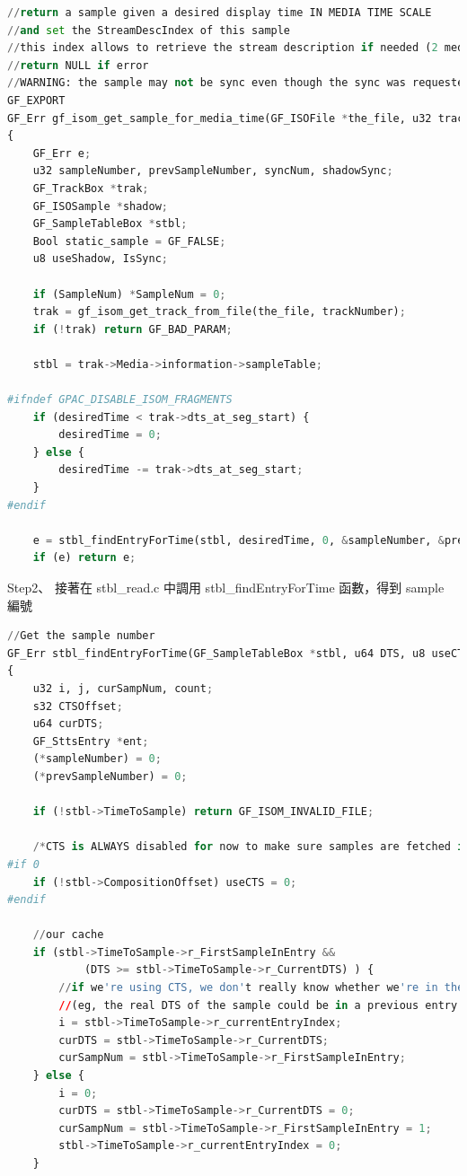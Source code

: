 \documentclass[10pt,UTF8]{ctexart}
\begin{document}
\begin{lstlisting}[language={python}]
//return a sample given a desired display time IN MEDIA TIME SCALE
//and set the StreamDescIndex of this sample
//this index allows to retrieve the stream description if needed (2 media in 1 track)
//return NULL if error
//WARNING: the sample may not be sync even though the sync was requested (depends on the media)
GF_EXPORT
GF_Err gf_isom_get_sample_for_media_time(GF_ISOFile *the_file, u32 trackNumber, u64 desiredTime, u32 *StreamDescriptionIndex, GF_ISOSearchMode SearchMode, GF_ISOSample **sample, u32 *SampleNum, u64 *data_offset)
{
	GF_Err e;
	u32 sampleNumber, prevSampleNumber, syncNum, shadowSync;
	GF_TrackBox *trak;
	GF_ISOSample *shadow;
	GF_SampleTableBox *stbl;
	Bool static_sample = GF_FALSE;
	u8 useShadow, IsSync;

	if (SampleNum) *SampleNum = 0;
	trak = gf_isom_get_track_from_file(the_file, trackNumber);
	if (!trak) return GF_BAD_PARAM;

	stbl = trak->Media->information->sampleTable;

#ifndef	GPAC_DISABLE_ISOM_FRAGMENTS
	if (desiredTime < trak->dts_at_seg_start) {
		desiredTime = 0;
	} else {
		desiredTime -= trak->dts_at_seg_start;
	}
#endif

	e = stbl_findEntryForTime(stbl, desiredTime, 0, &sampleNumber, &prevSampleNumber);
	if (e) return e;
\end{lstlisting}

Step2、 接著在 stbl\_read.c 中調⽤ stbl\_findEntryForTime 函數，得到 sample 編號

\begin{lstlisting}[language={python}]
//Get the sample number
GF_Err stbl_findEntryForTime(GF_SampleTableBox *stbl, u64 DTS, u8 useCTS, u32 *sampleNumber, u32 *prevSampleNumber)
{
	u32 i, j, curSampNum, count;
	s32 CTSOffset;
	u64 curDTS;
	GF_SttsEntry *ent;
	(*sampleNumber) = 0;
	(*prevSampleNumber) = 0;

	if (!stbl->TimeToSample) return GF_ISOM_INVALID_FILE;

	/*CTS is ALWAYS disabled for now to make sure samples are fetched in decoding order. useCTS is therefore disabled*/
#if 0
	if (!stbl->CompositionOffset) useCTS = 0;
#endif

	//our cache
	if (stbl->TimeToSample->r_FirstSampleInEntry &&
	        (DTS >= stbl->TimeToSample->r_CurrentDTS) ) {
		//if we're using CTS, we don't really know whether we're in the good entry or not
		//(eg, the real DTS of the sample could be in a previous entry
		i = stbl->TimeToSample->r_currentEntryIndex;
		curDTS = stbl->TimeToSample->r_CurrentDTS;
		curSampNum = stbl->TimeToSample->r_FirstSampleInEntry;
	} else {
		i = 0;
		curDTS = stbl->TimeToSample->r_CurrentDTS = 0;
		curSampNum = stbl->TimeToSample->r_FirstSampleInEntry = 1;
		stbl->TimeToSample->r_currentEntryIndex = 0;
	}

\end{lstlisting}
\end{document}
